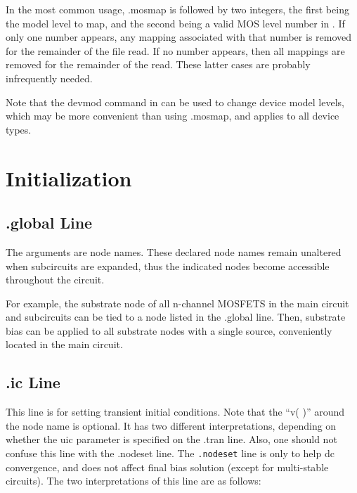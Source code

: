 In the most common usage, {\vt .mosmap} is followed by two integers,
the first being the model level to map, and the second being a valid
MOS level number in {\WRspice}.  If only one number appears, any
mapping associated with that number is removed for the remainder of
the file read.  If no number appears, then all mappings are removed
for the remainder of the read.  These latter cases are probably
infrequently needed.

Note that the {\cb devmod} command in {\WRspice} can be used to change
device model levels, which may be more convenient than using {\vt
.mosmap}, and applies to all device types.


\section{Initialization}


\subsection{{\vt .global} Line}

The arguments are node names.  These declared node names remain
unaltered when subcircuits are expanded, thus the indicated nodes
become accessible throughout the circuit.

For example, the substrate node of all n-channel MOSFETS in the main
circuit and subcircuits can be tied to a node listed in the {\vt
.global} line.  Then, substrate bias can be applied to all substrate
nodes with a single source, conveniently located in the main circuit.

\subsection{{\vt .ic} Line}
\label{icline}

This line is for setting transient initial conditions.  Note that the
``{\vt v( )}'' around the node name is optional.  It has two different
interpretations, depending on whether the {\vt uic} parameter is
specified on the {\vt .tran} line.  Also, one should not confuse this
line with the {\vt .nodeset} line.  The {\tt .nodeset} line is only to
help dc convergence, and does not affect final bias solution (except
for multi-stable circuits).  The two interpretations of this line are
as follows:

